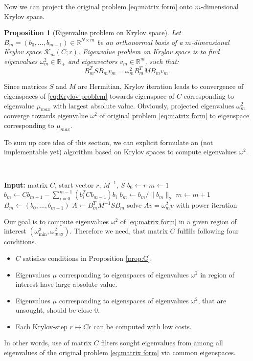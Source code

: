 \documentclass[a4paper,11pt,bibliography=totoc,listof=totoc,headinclude=true,cleardoublepage=empty,oneside]{scrbook}
\newtheorem{prop}[theorem]{Proposition}
\newcommand{\R}{\mathbb{R}}
\begin{document}
Now we can project the original problem \eqref{eq:matrix form} onto $m$-dimensional Krylov space. 
\begin{prop}[Eigenvalue problem on Krylov space]
    Let $B_m = (b_0, \dots, b_{m-1}) \in \R^{N\times m}$ be an orthonormal basis of a $m$-dimensional Krylov space $\mathcal{K}_m(C; r)$. Eigenvalue problem on Krylov space is to find eigenvalues $\omega_m^2 \in \R_+$ and eigenvectors $v_m\in\R^m$, such that:
    \begin{equation}\label{eq:Krylov problem}
        B_m^T S B_m v_m = \omega_m^2 B_m^T M B_m v_m.
    \end{equation}
\end{prop}

Since matrices $S$ and $M$ are Hermitian, Krylov iteration leads to convergence of eigenspaces of \eqref{eq:Krylov problem} towards eigenspace of $C$ corresponding to eigenvalue $\mu_{max}$ with largest absolute value. Obviously, projected eigenvalues $\omega_m^2$ converge towards eigenvalue $\omega^2$ of original problem \eqref{eq:matrix form} to eigenspace corresponding to $\mu_{max}$.

To sum up core idea of this section, we can explicit formulate an (not implementable yet) algorithm based on Krylov spaces to compute eigenvalues $\omega^2$.
\begin{algorithm}[H]
\caption{Krylov eigenvalue solver}\
    \begin{algorithmic}
        \State \textbf{Input:} matrix $C$, start vector $r$, $M^{-1}$, $S$
        \State $b_0 \gets r$
        \State $m \gets 1$ 
        \Do 
            \State $b_{m} \gets Cb_{m-1} - \sum_{i=0}^{m-1} (b_i^T C b_{m-1}) b_i$ 
            \State $ b_m \gets b_{m}/\|b_{m}\|_2 $ 
            \State $m \gets m+1$
            \State $B_m \gets (b_0, \dots, b_{m-1})$ 
            \State $A \gets B_m^T M^{-1}S B_m$
            \State solve $Av = \omega_m^2 v$ with power iteration
        \doWhile{stopping criterion}
    \end{algorithmic}
\end{algorithm}


Our goal is to compute eigenvalues $\omega^2$ of \eqref{eq:matrix form} in a given region of interest $(\omega_{\min}^2, \omega_{\max}^2)$. Therefore we need, that matrix $C$ fulfills following four conditions.
\begin{itemize}
    \item $C$ satisfies conditions in Proposition \ref{prop:C}.
    \item Eigenvalues $\mu$ corresponding to eigenspaces of eigenvalues $\omega^2$ in region of interest have large absolute value.
    \item Eigenvalues $\mu$ corresponding to eigenspaces of eigenvalues $\omega^2$, that are unsought, should be close 0. 
    \item Each Krylov-step $r \mapsto Cr$ can be computed with low costs.
\end{itemize}
In other words, use of matrix $C$ filters sought eigenvalues from among all eigenvalues of the original problem \eqref{eq:matrix form} via common eigenspaces. 
\end{document}
